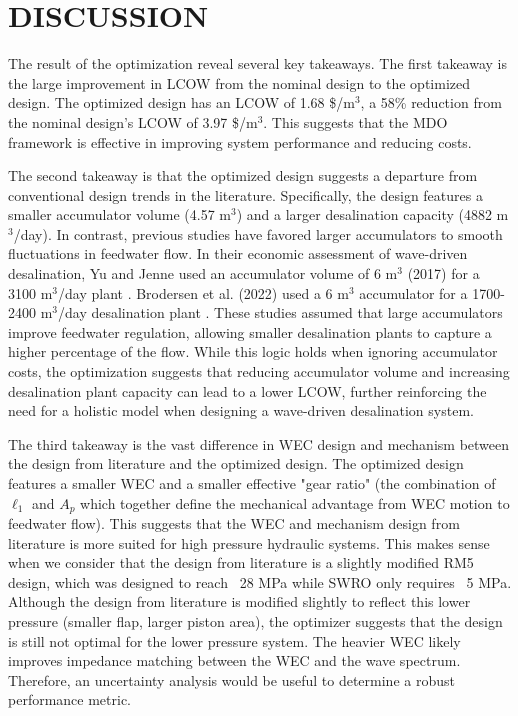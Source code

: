 \documentclass[twocolumn,10pt]{asme2e}
\begin{document}
\section{DISCUSSION}

The result of the optimization reveal several key takeaways. The first takeaway is the large improvement in LCOW from the nominal design to the optimized design. The optimized design has an LCOW of 1.68 \$/m$^3$, a 58\% reduction from the nominal design's LCOW of 3.97 \$/m$^3$. This suggests that the MDO framework is effective in improving system performance and reducing costs.

The second takeaway is that the optimized design suggests a departure from conventional design trends in the literature. Specifically, the design features a smaller accumulator volume (4.57 m$^3$) and a larger desalination capacity (4882 m$^3$/day). In contrast, previous studies have favored larger accumulators to smooth fluctuations in feedwater flow. In their economic assessment of wave-driven desalination, Yu and Jenne used an accumulator volume of 6 m$^3$ (2017) for a 3100 m$^3$/day plant \cite{YJecon2017}. Brodersen et al. (2022) used a 6 m$^3$ accumulator for a 1700-2400 m$^3$/day desalination plant \cite{Brodersen2022}. These studies assumed that large accumulators improve feedwater regulation, allowing smaller desalination plants to capture a higher percentage of the flow. While this logic holds when ignoring accumulator costs, the optimization suggests that reducing accumulator volume and increasing desalination plant capacity can lead to a lower LCOW, further reinforcing the need for a holistic model when designing a wave-driven desalination system.

The third takeaway is the vast difference in WEC design and mechanism between the design from literature and the optimized design. The optimized design features a smaller WEC and a smaller effective "gear ratio" (the combination of $\ell_1$ and $A_p$ which together define the mechanical advantage from WEC motion to feedwater flow). This suggests that the WEC and mechanism design from literature is more suited for high pressure hydraulic systems. This makes sense when we consider that the design from literature \cite{YJecon2017} is a slightly modified RM5 \cite{rm5} design, which was designed to reach ~28 MPa while SWRO only requires ~5 MPa. Although the design from literature is modified slightly to reflect this lower pressure (smaller flap, larger piston area), the optimizer suggests that the design is still not optimal for the lower pressure system. The heavier WEC likely improves impedance matching between the WEC and the wave spectrum. Therefore, an uncertainty analysis would be useful to determine a robust performance metric. 
\end{document}
